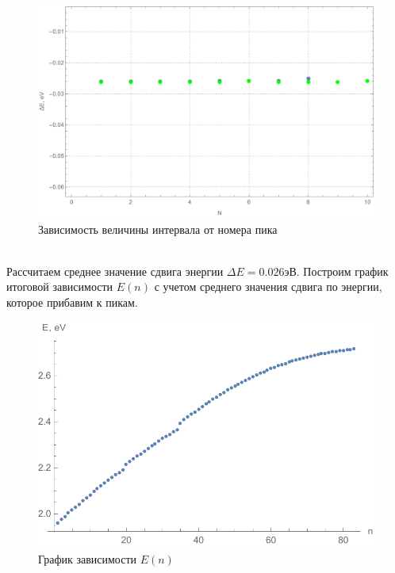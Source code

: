 \documentclass[a4paper, 12pt]{article}
\begin{document}
\begin{figure}[!htb]
\centering
\includegraphics[scale=0.6]{plot7.pdf}
\caption{Зависимость величины интервала от номера пика}
\label{plot7}
\end{figure}\\
Рассчитаем среднее значение сдвига энергии $\Delta E=0.026 эВ$. Построим график итоговой зависимости $E(n)$ с учетом среднего значения сдвига по энергии, которое прибавим к пикам.
\newpage
\begin{figure}[!htb]
\centering
\includegraphics[scale=0.8]{plot8.pdf}
\caption{График зависимости $E(n)$}
\end{figure}
\end{document}
